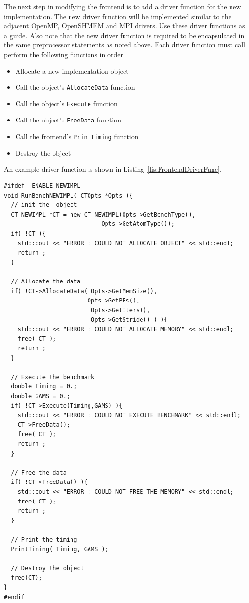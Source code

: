 \documentclass{article}
\begin{document}
The next step in modifying the frontend is to add a driver function 
for the new implementation.  The new driver function will be implemented 
similar to the adjacent OpenMP, OpenSHMEM and MPI drivers.  Use these 
driver functions as a guide.  Also note that the new driver function is required 
to be encapsulated in the same preprocessor statements as noted above.    
Each driver function must call perform the following functions in order:

\begin{itemize}
\item Allocate a new implementation object
\item Call the object's \texttt{AllocateData} function
\item Call the object's \texttt{Execute} function
\item Call the object's \texttt{FreeData} function
\item Call the frontend's \texttt{PrintTiming} function
\item Destroy the object
\end{itemize}

An example driver function is shown in Listing~\ref{lis:FrontendDriverFunc}.  

\clearpage
\vspace{0.125in}
\begin{lstlisting}[frame=single,style=base,caption={Frontend Driver Function},captionpos=b,label={lis:FrontendDriverFunc}]
#ifdef _ENABLE_NEWIMPL_
void RunBenchNEWIMPL( CTOpts *Opts ){
  // init the  object
  CT_NEWIMPL *CT = new CT_NEWIMPL(Opts->GetBenchType(),
                          	Opts->GetAtomType());
  if( !CT ){
    std::cout << "ERROR : COULD NOT ALLOCATE OBJECT" << std::endl;
    return ;
  }

  // Allocate the data
  if( !CT->AllocateData( Opts->GetMemSize(),
                       	Opts->GetPEs(),
                         Opts->GetIters(),
                         Opts->GetStride() ) ){
    std::cout << "ERROR : COULD NOT ALLOCATE MEMORY" << std::endl;
    free( CT );
    return ;
  }

  // Execute the benchmark
  double Timing = 0.;
  double GAMS = 0.;
  if( !CT->Execute(Timing,GAMS) ){
    std::cout << "ERROR : COULD NOT EXECUTE BENCHMARK" << std::endl;
    CT->FreeData();
    free( CT );
    return ;
  }

  // Free the data
  if( !CT->FreeData() ){
    std::cout << "ERROR : COULD NOT FREE THE MEMORY" << std::endl;
    free( CT );
    return ;
  }

  // Print the timing
  PrintTiming( Timing, GAMS );

  // Destroy the object
  free(CT);
}
#endif
\end{lstlisting}
\end{document}

